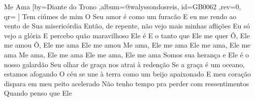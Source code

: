 \beginsong
{Me Ama %
}[by={Diante do Trono %
},album={@walyssondosreis},
id={GB0062 %
},rev={0}, %
qr={ %
}]
\beginverse*
Tem ciúmes de mim
O Seu amor é como um furacão
E eu me rendo ao vento de Sua misericórdia
Então, de repente, não vejo mais minhas aflições
Eu só vejo a glória
E percebo quão maravilhoso Ele é
E o tanto que Ele me quer
\endverse
\beginverse*
Ô, Ele me amou
Ô, Ele me ama
Ele me amou
\endverse
\beginchorus
Me ama, Ele me ama
Ele me ama, Ele me ama
Me ama, Ele me ama
Ele me ama, Ele me ama
\endchorus
\beginverse*
Somos sua herança e Ele é o nosso galardão
Seu olhar de graça nos atrai à redenção
Se a graça é um oceano, estamos afogando
O céu se une à terra como um beijo apaixonado
E meu coração dispara em meu peito acelerado
Não tenho tempo pra perder com ressentimentos
Quando penso que Ele
\endverse

